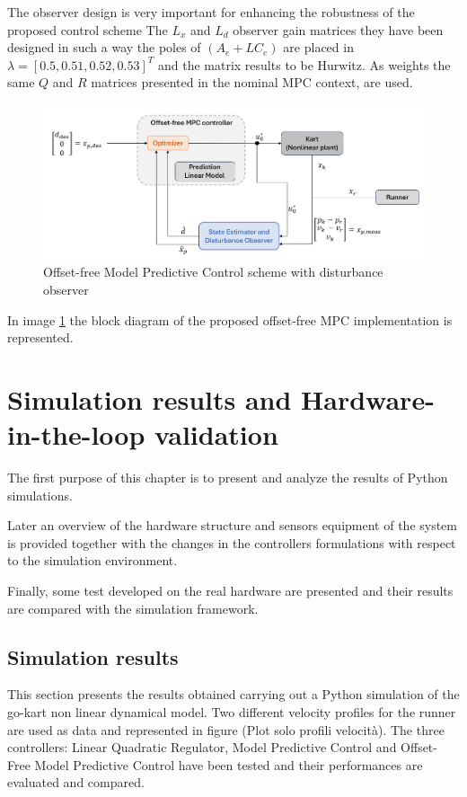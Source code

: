 \documentclass[a4paper,12pt,oneside]{book}
\begin{document}
The observer design is very important for enhancing the robustness of the proposed control scheme
The $L_x$ and $L_d$ observer gain matrices they have been designed in such a way the poles of $(A_e + L C_e)$ are placed in $\lambda=[0.5, 0.51, 0.52, 0.53]^T$ and the matrix results to be Hurwitz. 
As weights the same $Q$ and $R$ matrices presented in the nominal MPC context, are used.

\begin{figure}
	\centering
	\includegraphics[width=1.0\textwidth]{MPC_of_scheme.png}
	\caption{Offset-free Model Predictive Control scheme with disturbance observer}
	\label{image:mpc_of_scheme}
\end{figure}

In image \ref{image:mpc_of_scheme} the block diagram of the proposed offset-free MPC implementation is represented. 



\chapter{Simulation results and Hardware-in-the-loop validation}
\label{chapter:Simulations_and_results}
The first purpose of this chapter is to present and analyze the results of Python simulations.

Later an overview of the hardware structure and sensors equipment of the system is provided together with the changes in the controllers formulations with respect to the simulation environment. 

Finally, some test developed on the real hardware are presented and their results are compared with the simulation framework.

\section{Simulation results}
This section presents the results obtained carrying out a Python simulation of the go-kart non linear dynamical model.
Two different velocity profiles for the runner are used as data and represented in figure (Plot solo profili velocità).
The three controllers: Linear Quadratic Regulator, Model Predictive Control and Offset-Free Model Predictive Control have been tested and their performances are evaluated and compared.
\end{document}
